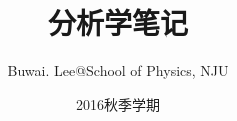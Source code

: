 \documentclass[10pt]{book}
\theoremstyle{definition}
\theoremstyle{plain}
\begin{document}
\begin{titlepage}
\setcounter{page}{-1}
\title{分析学笔记}
\author{Buwai. Lee@School of Physics, NJU}
\date{2016秋季学期}
\maketitle %
\end{titlepage}
\frontmatter
	\tableofcontents
\mainmatter
	
\end{document}
